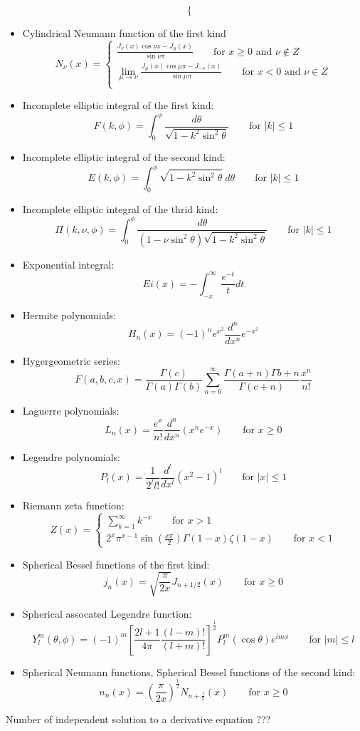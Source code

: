 \begin{itemize}
$$\begin{cases}
	    \end{cases}
	    $$
    \item Cylindrical Neumann function of the first kind
	$$ N_\nu(x) =
	    \begin{cases}
		\frac{J_{\nu}(x)\cos\nu x - J_\mu(x)}{\sin\nu\pi} \qquad \text{for } x\ge0 \text{ and } \nu \notin Z \\
		\displaystyle \lim_{\mu\rightarrow\nu}\frac{J_{\mu}(x)\cos\mu\pi - J_{-\nu}(x)}{\sin\mu\pi} \qquad \text{for } x<0 \text{ and } \nu \in Z \\
	    \end{cases}
	    $$
	\item Incomplete elliptic integral of the first kind:
	    $$ F(k,\phi) = \int_0^{\phi}\frac{d\theta}{\sqrt{1-k^2\sin^2\theta}}	\qquad \text{for } |k| \le 1$$
	\item Incomplete elliptic integral of the second kind:
	    $$ E(k,\phi) = \int_0^{\phi}\sqrt{1-k^2\sin^2\theta}\ d\theta	\qquad \text{for } |k| \le 1$$
	\item Incomplete elliptic integral of the thrid kind:
	    $$ \Pi(k,\nu,\phi) = \int_0^{\phi}\frac{d\theta}{(1-\nu\sin^2\theta)\sqrt{1-k^2\sin^2\theta}}	\qquad \text{for } |k| \le 1$$
	\item Exponential integral:
	    $$ Ei(x) = -\int_{-x}^\infty \frac{e^{-t}}{t}dt $$
	\item Hermite polynomials:
	    $$ H_n(x) = (-1)^n e^{x^2} \frac{d^n}{dx^n}e^{-x^2} $$
	\item Hygergeometric series:
	    $$ F(a,b,c,x) = \frac{\Gamma(c)}{\Gamma(a)\Gamma(b)}\sum_{n=0}^{\infty}\frac{\Gamma(a+n)\Gamma{b+n}}{\Gamma(c+n)}\frac{x^n}{n!}$$
	\item Laguerre polynomials:
	    $$ L_n(x) = \frac{e^x}{n!} \frac{d^n}{dx^n}\left(x^n e^{-x} \right)	\qquad \text{for } x\ge 0$$
	\item Legendre polynomials:
	    $$ P_l(x) = \frac{1}{2^l l!} \frac{d^l}{dx^l}(x^2 - 1)^l	\qquad \text{for } |x| \le 1$$
	\item Riemann zeta function:
	    $$ Z(x) = 
	    \begin{cases}
		\sum_{k=1}^{\infty} k^{-x}  \qquad \text{for } x > 1\\
		2^x \pi^{x-1}\sin\left( \frac{x\pi}{2} \right)\Gamma(1-x)\zeta(1-x) \qquad \text{for } x < 1
	    \end{cases}
	    $$
	\item Spherical Bessel functions of the first kind:
	    $$ j_n(x) = \sqrt{\frac{\pi}{2x}} J_{n+1/2}(x)  \qquad \text{for } x \ge 0$$
	\item Spherical assocated Legendre function:
	    $$ Y_l^m(\theta, \phi) = (-1)^m \left[ \frac{2l+1}{4\pi} \frac{(l-m)!}{(l+m)!}\right]^{\frac{1}{2}} P_l^m(\cos\theta)e^{im\phi} \qquad \text{for } |m| \le l$$
	\item Spherical Neumann functions, Spherical Bessel functions of the second kind:
	    $$ n_n(x) = \left(\frac{\pi}{2x} \right)^{\frac{1}{2}} N_{n+\frac{1}{2}}(x)	\qquad \text{for } x \ge 0 $$
\end{itemize}
Number of independent solution to a derivative equation ???
